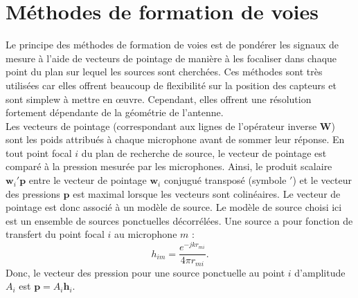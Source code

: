 \section{Méthodes de formation de voies}

Le principe des méthodes de formation de voies est de pondérer les signaux de mesure à l'aide de vecteurs de pointage de manière à les focaliser dans chaque point du plan sur lequel les sources sont cherchées.
Ces méthodes sont très utilisées  car elles offrent beaucoup de flexibilité sur la position des capteurs et sont simplew à mettre en œuvre. Cependant, elles offrent une résolution fortement dépendante de la géométrie de l'antenne.\\
Les vecteurs de pointage (correspondant aux lignes de l'opérateur inverse $\bm{W}$) sont les poids attribués à chaque microphone avant de sommer leur réponse.  En tout point focal $i$ du plan de recherche de source, le vecteur de pointage est comparé à la pression mesurée par les microphones. Ainsi, le produit scalaire $\bm{w}_i'\bm{p}$ entre le vecteur de pointage $\bm{w}_i$ conjugué transposé (symbole $'$) et le vecteur des pressions $\bm{p}$ est maximal lorsque les vecteurs sont colinéaires. Le vecteur de pointage est donc associé à un modèle de source. Le modèle de source choisi ici est un ensemble de sources ponctuelles décorrélées. Une source a pour fonction de transfert du point focal $i$ au microphone $m$ : 
\begin{equation}
	h_{im}=\frac{e^{-jkr_{mi}}}{4\pi r_{mi}}.
\end{equation}
Donc, le vecteur des pression pour une source ponctuelle au point $i$ d'amplitude $A_i$ est $\bm{p}=A_i\bm{h}_i$.\\



